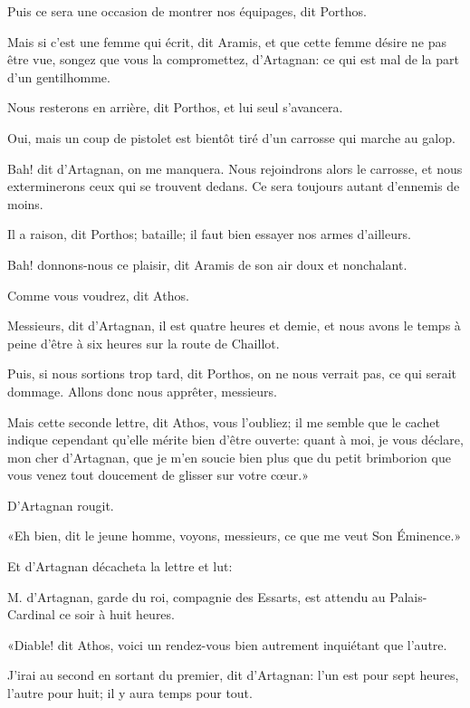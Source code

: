 \speak  Puis ce sera une occasion de montrer nos équipages, dit Porthos. 

\speak  Mais si c'est une femme qui écrit, dit Aramis, et que cette femme désire ne pas être vue, songez que vous la compromettez, d'Artagnan: ce qui est mal de la part d'un gentilhomme. 

\speak  Nous resterons en arrière, dit Porthos, et lui seul s'avancera. 

\speak  Oui, mais un coup de pistolet est bientôt tiré d'un carrosse qui marche au galop. 

\speak  Bah! dit d'Artagnan, on me manquera. Nous rejoindrons alors le carrosse, et nous exterminerons ceux qui se trouvent dedans. Ce sera toujours autant d'ennemis de moins. 

\speak  Il a raison, dit Porthos; bataille; il faut bien essayer nos armes d'ailleurs. 

\speak  Bah! donnons-nous ce plaisir, dit Aramis de son air doux et nonchalant. 

\speak  Comme vous voudrez, dit Athos. 

\speak  Messieurs, dit d'Artagnan, il est quatre heures et demie, et nous avons le temps à peine d'être à six heures sur la route de Chaillot. 

\speak  Puis, si nous sortions trop tard, dit Porthos, on ne nous verrait pas, ce qui serait dommage. Allons donc nous apprêter, messieurs. 

\speak  Mais cette seconde lettre, dit Athos, vous l'oubliez; il me semble que le cachet indique cependant qu'elle mérite bien d'être ouverte: quant à moi, je vous déclare, mon cher d'Artagnan, que je m'en soucie bien plus que du petit brimborion que vous venez tout doucement de glisser sur votre cœur.» 

D'Artagnan rougit. 

«Eh bien, dit le jeune homme, voyons, messieurs, ce que me veut Son Éminence.» 

Et d'Artagnan décacheta la lettre et lut:

\begin{mail}{}{}
M. d'Artagnan, garde du roi, compagnie des Essarts, est attendu au Palais-Cardinal ce soir à huit heures. 
\end{mail}

«Diable! dit Athos, voici un rendez-vous bien autrement inquiétant que l'autre. 

\speak  J'irai au second en sortant du premier, dit d'Artagnan: l'un est pour sept heures, l'autre pour huit; il y aura temps pour tout. 

